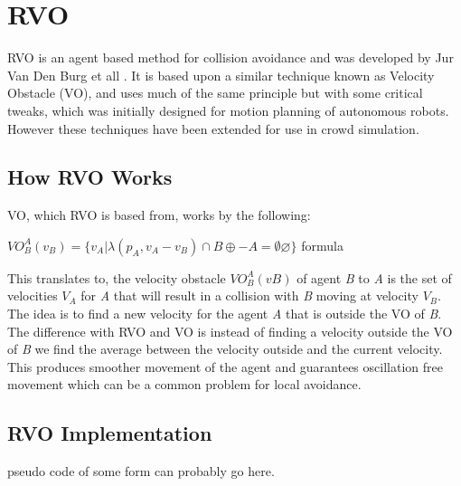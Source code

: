 \documentclass[a4paper,twocolumn]{article}
\begin{document}
\section{RVO}
RVO  is an agent based method for collision avoidance and was developed by Jur Van Den Burg et all \cite{JBerg2008RVO}. It is based upon a similar technique known as Velocity Obstacle (VO), and uses much of the same principle but with some critical tweaks, which was initially designed for motion planning of autonomous robots. However these techniques have been extended for use in crowd  simulation.


\subsection{How RVO Works}
\cite{DCherry2013RVO}
\cite{AGuy2009CP}
\cite{JBerg2008CS}
VO, which RVO is based from, works by the following:\\
\begin{center}
$VO^{A}_{B} (v_{B} ) = \{v_{A} | λ(p_{A} , v_{A} − v_{B} ) ∩ B ⊕ − A = ∅ \varnothing \}$
formula\\
\end{center}

This translates to, the velocity obstacle $VO^{A}_{B} (v B )$ of agent \emph{B} to \emph{A} is the set of velocities $V_{A}$ for \emph{A} that will result in a collision with \emph{B} moving at velocity $V_{B}$. The idea is to find a new velocity for the agent \emph{A} that is outside the VO of \emph{B}. The difference with RVO and VO is instead of finding a velocity outside the VO of \emph{B} we find the average between the velocity outside and the current velocity. This produces smoother movement of the agent and guarantees oscillation free movement which can be a common problem for local avoidance.

\subsection{RVO Implementation}
pseudo code of some form can probably go here.
\end{document}
